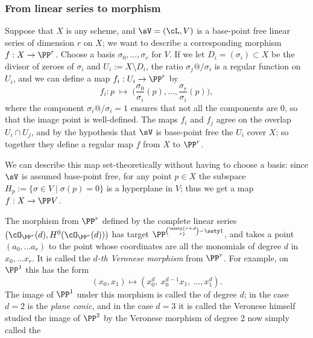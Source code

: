 \subsubsection*{From linear series to morphism}

Suppose  that $X$ is any scheme, and $\sV = (\cL, V)$ is a base-point
free linear series of dimension $r$ on $X$; we want to describe a
corresponding morphism $f : X \to \PP^r$. Choose a basis $\sigma_0,
\dots, \sigma_r$ for $V$. If we let $D_i = (\sigma_i) \subset X$ be
the divisor of zeroes of $\sigma_i$ and 
$U_i := X \setminus D_i$, 
the ratio $\sigma_j@/\sigma_i$ is a regular function on $U_i$, and
we can define a map $f_i : U_i \to \PP^r$ by
$$
f_i : p \; \mapsto \; \Big(\frac{\sigma_0}{\sigma_i}(p), \dots, \frac{\sigma_r}{\sigma_i}(p)\Big), 
$$
where the component $\sigma_i@/\sigma_i = 1$ ensures that not all the components are 0, so that the image point is well-defined.
The maps $f_i$ and $f_j$ agree on the overlap $U_i \cap U_j$, and by the hypothesis that $\sV$ is base-point free the $U_i$ cover $X$;
so together they define a regular map $f$ from $X$ to $\PP^r$. 

We can describe this map set-theoretically without having to choose a basis: since $\sV$ is assumed base-point free, for any point $p \in X$ the subspace $H_p := \{ \sigma \in V \mid \sigma(p) = 0 \}$ is a hyperplane in $V$; thus we get a map $f : X \to \PP V$.

\begin{example}\label{Veronese definition}
The morphism 
\vspace*{-2pt}%
from $\PP^r$ defined by the complete linear series 
$(\cO_{\PP^r}(d), H^0(\cO_{\PP^r}(d)))$ has target
$\PP^{\sssty{r+d\choose r}-\ssty 1}$, 
and takes a point $(a_0,\dots a_r)$ to the point whose coordinates are all the monomials of
degree $d$ in $x_0,\dots x_r$. It is called the \emph{$d$-th Veronese morphism} from $\PP^r$. For example, on $\PP^1$ this has the form
%
%
$$
(x_0,x_1) \mapsto (x_0^d,\ x_0^{d-1}x_1,\ \dots,x_1^d).
$$
The image of $\PP^1$ under this morphism is called 
%
%
%
%
the 
of degree $d$; in the case $d=2$ is the
\emph{plane conic}, and in the case $d=3$ it is called the 
Veronese himself studied the image of $\PP^2$
by the Veronese morphism of degree 2 now simply called the 
\end{example}

